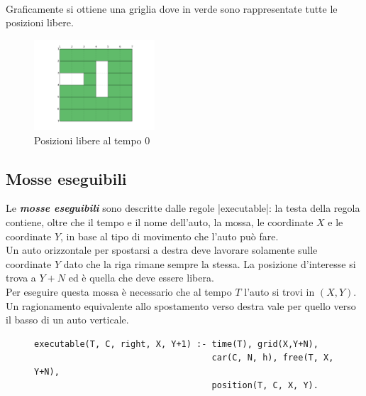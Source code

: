 \documentclass[10pt, a4paper, oneside]{article}
\begin{document}
\noindent
\\Graficamente si ottiene una griglia dove in verde sono rappresentate tutte le posizioni libere.
\begin{figure}[H]
  \centering
  \includegraphics[width=0.4\textwidth]{images/free.PNG}
  \caption{Posizioni libere al tempo 0}
  \label{fig:}
\end{figure}



\subsection{Mosse eseguibili}
Le \emph{\textbf{mosse eseguibili}} sono descritte dalle regole |executable|: la testa della regola contiene, oltre che il tempo e il nome dell'auto, la mossa, le coordinate $X$ e le coordinate $Y$, in base al tipo di movimento che l'auto può fare. \\

\noindent %
Un auto orizzontale per spostarsi a destra deve lavorare solamente sulle coordinate $Y$ dato che la riga rimane sempre la stessa. La posizione d'interesse si trova a $Y+N$ ed è quella che deve essere libera. \\ %

\noindent
Per eseguire questa mossa è necessario che al tempo $T$ l'auto si trovi in $(X,Y)$.
Un ragionamento equivalente allo spostamento verso destra vale per quello verso il basso di un auto verticale.

\begin{figure}[H]
\centering
\begin{verbatim}
executable(T, C, right, X, Y+1) :- time(T), grid(X,Y+N), 
                                   car(C, N, h), free(T, X, Y+N), 
                                   position(T, C, X, Y).
\end{verbatim}
\label{code:executable_right}
\end{figure}
\end{document}
